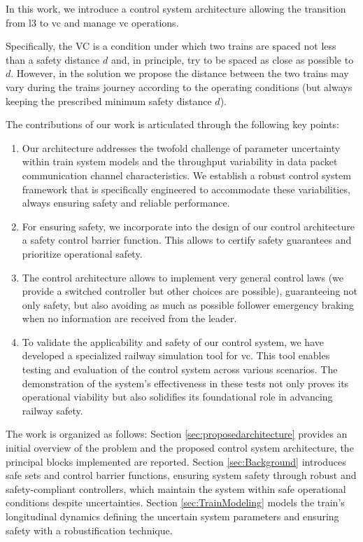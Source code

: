 In this work, we introduce a control system architecture
allowing the transition from \gls{l3} to \gls{vc} and manage \gls{vc} operations. 

Specifically, the VC is a condition under which two trains are spaced not less than a safety distance $d$ and, in principle, try to be spaced as close as possible to $d$. 
However, in the solution we propose the distance between the two trains may vary during the trains journey according to the operating conditions (but always keeping the prescribed minimum safety distance $d$).



The contributions of our work is articulated through the following key points:

\begin{enumerate}
	
	\item Our architecture addresses the twofold challenge of parameter uncertainty within train system models and the throughput variability in data packet communication channel characteristics. We establish a robust control system framework that is specifically engineered to accommodate these variabilities, always ensuring safety and reliable performance.
	
	
	\item For ensuring safety, we incorporate into the design of our control architecture a safety control barrier function. This allows to certify safety guarantees and  prioritize operational safety.
	
	\item The control architecture allows to implement very general control laws (we provide a switched controller but other choices are possible), guaranteeing not only safety, but also  avoiding as much as possible follower emergency braking when no information are received from the leader.
	
	\item To validate the applicability and safety of our control system, we have developed a specialized railway simulation tool for \gls{vc}. This tool enables testing and evaluation of the control system across various scenarios. The demonstration of the system's effectiveness in these tests not only proves its operational viability but also solidifies its foundational role in advancing railway safety.
\end{enumerate}
%
The work is organized as follows: Section \ref{sec:proposedarchitecture} provides an initial overview of the problem and the proposed control system architecture, the principal blocks implemented are reported. Section \ref{sec:Background} introduces safe sets and control barrier functions, ensuring system safety through robust and safety-compliant controllers, which maintain the system within safe operational conditions despite uncertainties. Section \ref{sec:TrainModeling} models the train's longitudinal dynamics defining the uncertain system parameters and ensuring safety with a robustification technique.
